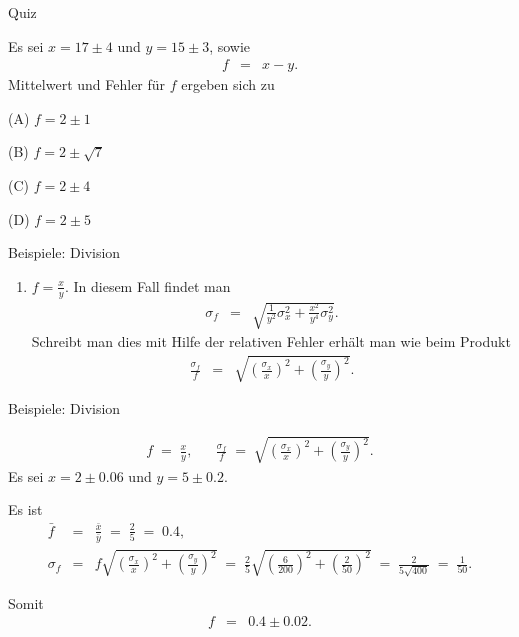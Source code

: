 \documentclass[german]{beamer}
\newcommand{\bq}{\begin{eqnarray*}}
\newcommand{\eq}{\end{eqnarray*}}
\begin{document}
\begin{frame}{Quiz}

Es sei $x=17 \pm 4$ und $y=15\pm3$, sowie
\bq
 f & = & x-y.
\eq
Mittelwert und Fehler f\"ur $f$ ergeben sich zu
\begin{description}
\item{(A)} $f = 2 \pm 1$
\item{(B)} $f = 2 \pm \sqrt{7}$
\item{(C)} $f = 2 \pm 4$
\item{(D)} $f = 2 \pm 5$
\end{description}

\end{frame}

\begin{frame}{Beispiele: Division}

\begin{enumerate}[4]

\item $f = \frac{x}{y}$. In diesem Fall findet man
\bq 
\sigma_f & = & \sqrt{\frac{1}{y^2} \sigma_x^2 + \frac{x^2}{y^4} \sigma_y^2}.
\eq
Schreibt man dies mit Hilfe der relativen Fehler erh\"alt man wie beim Produkt
\bq
 \frac{\sigma_f}{f} & = & \sqrt{ \left(\frac{\sigma_x}{x}\right)^2 + \left(\frac{\sigma_y}{y}\right)^2 }.
\eq

\end{enumerate}

\end{frame}

\begin{frame}{Beispiele: Division}

\begin{example}
\bq
 f \; = \; \frac{x}{y},
 & & 
 \frac{\sigma_f}{f} \; = \; \sqrt{ \left(\frac{\sigma_x}{x}\right)^2 + \left(\frac{\sigma_y}{y}\right)^2 }.
\eq
Es sei $x=2\pm 0.06$ und $y=5\pm 0.2$.

\vspace*{5mm}
Es ist
{\footnotesize
\bq
 \bar{f} & = & \frac{\bar{x}}{\bar{y}} \; = \; \frac{2}{5} \; = \; 0.4,
 \nonumber \\
 \sigma_f & = & f \sqrt{ \left(\frac{\sigma_x}{x}\right)^2 + \left(\frac{\sigma_y}{y}\right)^2 } 
 \; = \; 
 \frac{2}{5} \sqrt{ \left(\frac{6}{200}\right)^2 + \left(\frac{2}{50}\right)^2 }
 \; = \;
 \frac{2}{5 \sqrt{400}}
 \; = \; 
 \frac{1}{50}.
\eq
}

\vspace*{-2mm}
Somit
\bq
 f & = & 0.4 \pm 0.02.
\eq
\end{example}

\end{frame}
\end{document}
